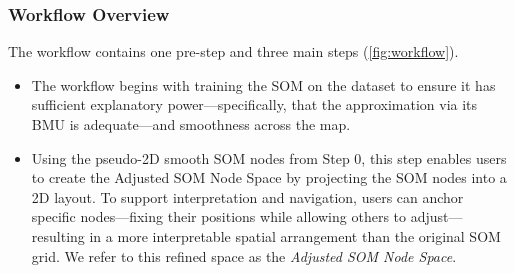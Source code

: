 %
\subsubsection{Workflow Overview}\label{ssec:workflow_overview}
The workflow contains one pre-step and three main steps (\cref{fig:workflow}).
\begin{itemize}[left=0pt, itemsep=0pt, labelsep=1em, align=left]
    \item[\step{S0} \textbf{Training the SOM}]
        The workflow begins with training the SOM on the dataset to ensure it has sufficient explanatory power---specifically, that the approximation via its BMU is adequate---and smoothness across the map.
    \item[\step{S1} \textbf{Anchor}]
        Using the pseudo-2D smooth SOM nodes from Step 0, this step enables users to create the Adjusted SOM Node Space by projecting the SOM nodes into a 2D layout. To support interpretation and navigation, users can anchor specific nodes---fixing their positions while allowing others to adjust---resulting in a more interpretable spatial arrangement than the original SOM grid. 
        We refer to this refined space as the \textit{Adjusted SOM Node Space}.

\end{itemize}

